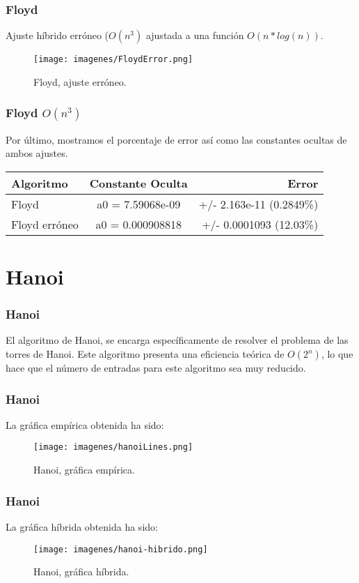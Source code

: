 \documentclass{beamer}
\begin{document}
\begin{frame}
	\frametitle{Floyd}
	Ajuste híbrido erróneo ($O(n^3)$ ajustada a una función $O(n * log(n))$.
	\begin{figure}
		\centering
		\texttt{[image: imagenes/FloydError.png]}
		\caption{Floyd, ajuste erróneo.}
		\label{fig:E18}
	\end{figure}
\end{frame}

\begin{frame}
	\frametitle{Floyd $O(n^3)$}
	Por último, mostramos el porcentaje de error así como las constantes ocultas de ambos ajustes.\\
	
	\begin{center}
		\begin{tabular}{| l | c | r |}
			\hline
			\textbf{Algoritmo} & \textbf{Constante Oculta} & \textbf{Error} \\ \hline
			Floyd & a0 = 7.59068e-09 & +/- 2.163e-11    (0.2849\%)\\ \hline
			Floyd erróneo & a0 = 0.000908818 & +/- 0.0001093 (12.03\%) \\ \hline
		\end{tabular}
	\end{center}

\end{frame}

\section{Hanoi}

\begin{frame}
	\frametitle{Hanoi}
	El algoritmo de Hanoi, se encarga específicamente de resolver el problema de las torres de Hanoi. Este algoritmo presenta una eficiencia teórica de $O(2^n)$, lo que hace que el número de entradas para este algoritmo sea muy reducido.
\end{frame}

\begin{frame}
	\frametitle{Hanoi}
	La gráfica empírica obtenida ha sido:
	\begin{figure}
		\centering
		\texttt{[image: imagenes/hanoiLines.png]}
		\caption{Hanoi, gráfica empírica.}
		\label{fig:E19}
	\end{figure}
	
\end{frame}

\begin{frame}
	\frametitle{Hanoi}
	La gráfica híbrida obtenida ha sido:
	\begin{figure}
		\centering
		\texttt{[image: imagenes/hanoi-hibrido.png]}
		\caption{Hanoi, gráfica híbrida.}
		\label{fig:E20}
	\end{figure}
\end{frame}
\end{document}
